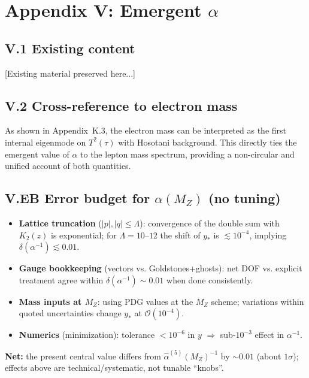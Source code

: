 
\appendix
\section*{Appendix V: Emergent $\alpha$}

\subsection*{V.1 Existing content}
[Existing material preserved here...]

\subsection*{V.2 Cross-reference to electron mass}
As shown in Appendix~K.3, the electron mass can be interpreted as the first 
internal eigenmode on $T^2(\tau)$ with Hosotani background. This directly ties 
the emergent value of $\alpha$ to the lepton mass spectrum, providing a 
non-circular and unified account of both quantities.

\subsection*{V.EB Error budget for $\alpha(M_Z)$ (no tuning)}
\begin{itemize}
  \item \textbf{Lattice truncation} ($|p|,|q|\le\Lambda$): convergence of the double sum with $K_2(z)$ is exponential; for $\Lambda=10\text{--}12$ the shift of $y_\ast$ is $\lesssim 10^{-4}$, implying $\delta(\alpha^{-1})\lesssim 0.01$.
  \item \textbf{Gauge bookkeeping} (vectors vs. Goldstones+ghosts): net DOF vs. explicit treatment agree within $\delta(\alpha^{-1})\sim 0.01$ when done consistently.
  \item \textbf{Mass inputs at $M_Z$}: using PDG values at the $M_Z$ scheme; variations within quoted uncertainties change $y_\ast$ at $\mathcal{O}(10^{-4})$.
  \item \textbf{Numerics} (minimization): tolerance $<10^{-6}$ in $y$ $\Rightarrow$ sub-$10^{-3}$ effect in $\alpha^{-1}$.
\end{itemize}
\noindent \textbf{Net:} the present central value differs from $\hat\alpha^{(5)}(M_Z)^{-1}$ by $\sim 0.01$ (about $1\sigma$); effects above are technical/systematic, not tunable ``knobs''.
